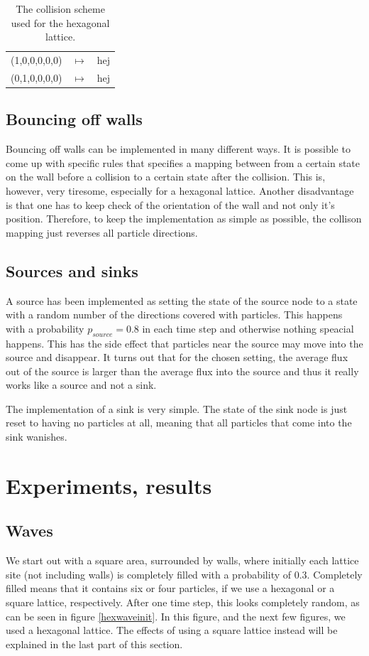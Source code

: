 \documentclass[12pt,a4paper]{article}
\begin{document}
\begin{table}\centering
\caption{The collision scheme used for the hexagonal lattice.}
\label{collisionscheme}
\begin{tabular}{ccc}
  (1,0,0,0,0,0)& $\mapsto$ & hej\\
  (0,1,0,0,0,0)& $\mapsto$ & hej\\
\end{tabular}
\end{table}


\subsection{Bouncing off walls}
Bouncing off walls can be implemented in many different ways. It is possible to
come up with specific rules that specifies a mapping between from a certain state
on the wall before a collision to a certain state after the collision. This is, 
however, very tiresome, especially for a hexagonal lattice. Another disadvantage
is that one has to keep check of the orientation of the wall and not only it's 
position. Therefore, to keep the implementation as simple as possible, the collison
mapping just reverses all particle directions.

\subsection{Sources and sinks}
A source has been implemented as setting the state of the source node to a state
with a random number of the directions covered with particles. This happens with 
a probability $p_{source}=0.8$ in each time step and otherwise nothing speacial
happens. This has the side effect that particles near the source may move into the
source and disappear. It turns out that for the chosen setting, the average flux
out of the source is larger than the average flux into the source and thus it really
works like a source and not a sink.

The implementation of a sink is very simple. The state of the sink node is just reset
to having no particles at all, meaning that all particles that come into the sink 
wanishes. 


\section{Experiments, results}
\label{sec:exp}
\subsection{Waves}
We start out with a square area, surrounded by walls, where initially each lattice site (not including walls)
is completely filled with a probability of 0.3. Completely filled means that it contains six or
four particles, if we use a hexagonal or a square lattice, respectively. After one time step,
this looks completely random, as can be seen in figure \ref{hexwaveinit}. In this figure, and the
next few figures, we used a hexagonal lattice. The effects of using a square lattice instead will be
explained in the last part of this section.
\end{document}
